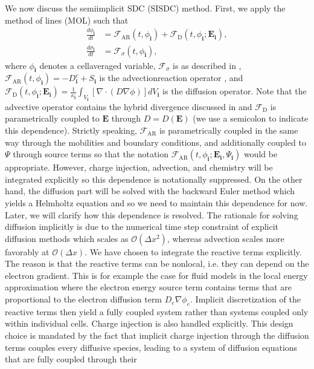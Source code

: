 \documentclass[letterpaper,10pt,english]{sphinxmanual}
\begin{document}
We now discuss the semi\sphinxhyphen{}implicit SDC (SISDC) method. First, we apply the method of lines (MOL) such that
\begin{align}
\frac{d\phi_{\mathbf{i}}}{dt} &= \mathcal{F}_{\textrm{AR}}\left(t, \phi_{\mathbf{i}}\right) + \mathcal{F}_{\textrm{D}}\left(t, \phi_{\mathbf{i}}; \mathbf{E}_{\mathbf{i}}\right), \\
\frac{d\sigma_{\mathbf{i}}}{dt} &= \mathcal{F}_{\sigma}\left(t, \phi_{\mathbf{i}}\right),
\end{align}
where \(\phi_{\mathbf{i}}\) denotes a cell\sphinxhyphen{}averaged variable, \(\mathcal{F}_{\sigma}\) is as described in {\hyperref[\detokenize{Model:chap-spatialdiscretization}]{}}, \(\mathcal{F}_{\textrm{AR}}\left(t, \phi_{\mathbf{i}}\right) = -D^c_{\mathbf{i}} + S_{\mathbf{i}}\) is the advection\sphinxhyphen{}reaction operator , and \(\mathcal{F}_{\textrm{D}}(t, \phi_{\mathbf{i}}; \mathbf{E}_{\mathbf{i}}) = \frac{1}{\kappa_{\mathbf{i}}}\int_{V_{\mathbf{i}}}\left[\nabla\cdot\left(D\nabla\phi\right)\right]dV_{\mathbf{i}}\) is the diffusion operator. Note that the advective operator contains the hybrid divergence discussed in {\hyperref[\detokenize{CDR:chap-cdr}]{}} and \(\mathcal{F}_{\textrm{D}}\) is parametrically coupled to \(\mathbf{E}\) through \(D = D\left(\mathbf{E}\right)\) (we use a semi\sphinxhyphen{}colon to indicate this dependence). Strictly speaking, \(\mathcal{F}_{\textrm{AR}}\) is parametrically coupled in the same way through the  mobilities and boundary conditions, and additionally coupled to \(\Psi\) through source terms so that the notation \(\mathcal{F}_{\textrm{AR}}\left(t, \phi_{\mathbf{i}}; \mathbf{E}_{\mathbf{i}}, \Psi_{\mathbf{i}}\right)\) would be appropriate. However, charge injection, advection, and chemistry will be integrated explicitly so this dependence is notationally suppressed. On the other hand, the diffusion part will be solved with the backward Euler method \sphinxhyphen{} which yields a Helmholtz equation \sphinxhyphen{} and so we need to maintain this dependence for now. Later, we will clarify how this dependence is resolved. The rationale for solving diffusion implicitly is due to the numerical time step constraint of explicit diffusion methods which scales as \(\mathcal{O}\left(\Delta x^2\right)\), whereas advection scales more favorably at \(\mathcal{O}\left(\Delta x\right)\). We have chosen to integrate the reactive terms explicitly. The reason is that the reactive terms can be non\sphinxhyphen{}local, i.e. they can depend on the electron gradient. This is for example the case for fluid models in the local energy approximation where the electron energy source term contains terms that are proportional to the electron diffusion term \(D_e\nabla\phi_e\). Implicit discretization of the reactive terms then yield a fully coupled system rather than systems coupled only within individual cells. Charge injection is also handled explicitly. This design choice is mandated by the fact that implicit charge injection through the diffusion terms couples every diffusive species, leading to a system of diffusion equations that are fully coupled through their 
\end{document}

